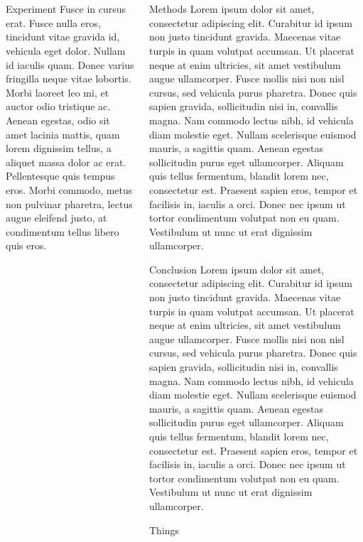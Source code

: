 \documentclass[12pt]{beamer}
\renewcommand{\maketitle}{%
	\begin{center}%
		\Huge\inserttitle\\[7mm]%
		\Large\insertauthor\\[5mm]%
		\Large\insertinstitute%
	\end{center}%
	\vspace*{-2ex}%
}
\begin{document}
\begin{frame}{\maketitle}
\begin{columns}
\begin{column}{.45\textwidth}
\begin{block}{Experiment}
					Fusce in cursus erat. Fusce nulla eros, tincidunt vitae gravida id, vehicula eget dolor. Nullam id iaculis quam. Donec varius fringilla neque vitae lobortis. Morbi laoreet leo mi, et auctor odio tristique ac. Aenean egestas, odio sit amet lacinia mattis, quam lorem dignissim tellus, a aliquet massa dolor ac erat. Pellentesque quis tempus eros. Morbi commodo, metus non pulvinar pharetra, lectus augue eleifend justo, at condimentum tellus libero quis eros.
				\end{block}
			\end{column}
			\begin{column}{.45\textwidth}
				\begin{block}{Methods}
					Lorem ipsum dolor sit amet, consectetur adipiscing elit. Curabitur id ipsum non justo tincidunt gravida. Maecenas vitae turpis in quam volutpat accumsan. Ut placerat neque at enim ultricies, sit amet vestibulum augue ullamcorper. Fusce mollis nisi non nisl cursus, sed vehicula purus pharetra. Donec quis sapien gravida, sollicitudin nisi in, convallis magna. Nam commodo lectus nibh, id vehicula diam molestie eget. Nullam scelerisque euismod mauris, a sagittis quam. Aenean egestas sollicitudin purus eget ullamcorper. Aliquam quis tellus fermentum, blandit lorem nec, consectetur est. Praesent sapien eros, tempor et facilisis in, iaculis a orci. Donec nec ipsum ut tortor condimentum volutpat non eu quam. Vestibulum ut nunc ut erat dignissim ullamcorper.
				\end{block}
				\vspace{1em}
				\begin{exampleblock}{Conclusion}
					Lorem ipsum dolor sit amet, consectetur adipiscing elit. Curabitur id ipsum non justo tincidunt gravida. Maecenas vitae turpis in quam volutpat accumsan. Ut placerat neque at enim ultricies, sit amet vestibulum augue ullamcorper. Fusce mollis nisi non nisl cursus, sed vehicula purus pharetra. Donec quis sapien gravida, sollicitudin nisi in, convallis magna. Nam commodo lectus nibh, id vehicula diam molestie eget. Nullam scelerisque euismod mauris, a sagittis quam. Aenean egestas sollicitudin purus eget ullamcorper. Aliquam quis tellus fermentum, blandit lorem nec, consectetur est. Praesent sapien eros, tempor et facilisis in, iaculis a orci. Donec nec ipsum ut tortor condimentum volutpat non eu quam. Vestibulum ut nunc ut erat dignissim ullamcorper.
				\end{exampleblock}
				\vspace{1em}
				\begin{block}{Things}

\end{block}
\end{column}
\end{columns}
\end{frame}
\end{document}
